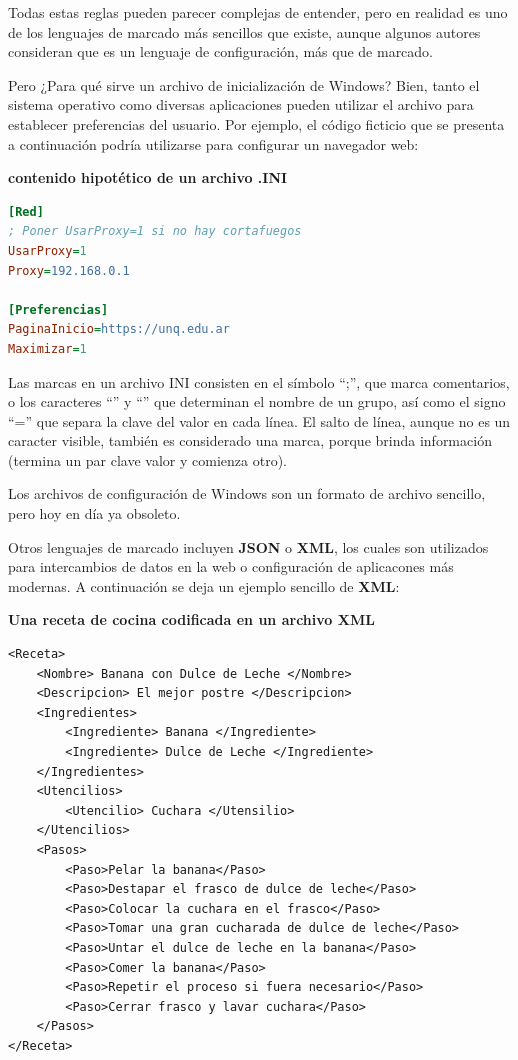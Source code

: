 Todas estas reglas pueden parecer complejas de entender, pero en realidad es uno
de los lenguajes de marcado más sencillos que existe, aunque algunos autores
consideran que es un lenguaje de configuración, más que de marcado.

Pero ¿Para qué sirve un archivo de inicialización de Windows? Bien, tanto
el sistema operativo como diversas aplicaciones pueden utilizar el archivo
para establecer preferencias del usuario. Por ejemplo, el código
ficticio que se presenta a continuación podría utilizarse para configurar un
navegador web:

\begin{example}

    \textbf{contenido hipotético de un archivo .INI}

    \begin{lstlisting}[language=ini]
[Red]
; Poner UsarProxy=1 si no hay cortafuegos
UsarProxy=1
Proxy=192.168.0.1

[Preferencias]
PaginaInicio=https://unq.edu.ar
Maximizar=1
    \end{lstlisting}
\end{example}

Las marcas en un archivo INI consisten en el símbolo ``;'', que marca comentarios,
o los caracteres ``\lbrack'' y ``\rbrack'' que determinan el nombre de un grupo,
así como el signo ``='' que separa la clave del valor en cada línea. El salto
de línea, aunque no es un caracter visible, también es considerado una marca,
porque brinda información (termina un par clave valor y comienza otro).

Los archivos de configuración de Windows son un formato de archivo sencillo,
pero hoy en día ya obsoleto.

Otros lenguajes de marcado incluyen \textbf{JSON} o \textbf{XML}, los cuales
son utilizados para intercambios de datos en la web o configuración de aplicacones
más modernas. A continuación se deja un ejemplo sencillo de \textbf{XML}:\autocite{marshal_2000}

\begin{example}
    
    \textbf{Una receta de cocina codificada en un archivo XML}


    \begin{lstlisting}[language=XHTML]
<Receta>
    <Nombre> Banana con Dulce de Leche </Nombre>
    <Descripcion> El mejor postre </Descripcion>
    <Ingredientes>
        <Ingrediente> Banana </Ingrediente>
        <Ingrediente> Dulce de Leche </Ingrediente>
    </Ingredientes>
    <Utencilios>
        <Utencilio> Cuchara </Utensilio>
    </Utencilios>
    <Pasos>
        <Paso>Pelar la banana</Paso>
        <Paso>Destapar el frasco de dulce de leche</Paso>
        <Paso>Colocar la cuchara en el frasco</Paso>
        <Paso>Tomar una gran cucharada de dulce de leche</Paso>
        <Paso>Untar el dulce de leche en la banana</Paso>
        <Paso>Comer la banana</Paso>
        <Paso>Repetir el proceso si fuera necesario</Paso>
        <Paso>Cerrar frasco y lavar cuchara</Paso>
    </Pasos>
</Receta>
    \end{lstlisting}

\end{example}

